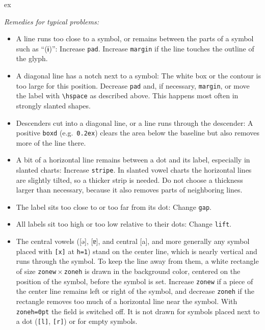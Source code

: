 \documentclass[a4paper,11pt]{article}
\newcommand\cmd[1]{\texttt{\textbackslash #1}}
\newcommand\opt[1]{\texttt{#1}}
\begin{document}
\begin{tcblisting}{ex}
\begin{vowelchart}[slanted] %
\end{vowelchart}
\end{tcblisting}

\noindent\textit{Remedies for typical problems:}
\begin{itemize}
	\item
	A line runs too close to a symbol, or remains between the parts of a symbol such as “(ɨ)”:
	Increase \opt{pad}. Increase \opt{margin} if the line touches the outline of the glyph.
	\item
	A diagonal line has a notch next to a symbol:
	The white box or the contour is too large for this position. Decrease \opt{pad} and, if necessary, \opt{margin}, or move the label with \cmd{hspace} as described above. This happens most often in strongly slanted shapes.
	\item
	Descenders cut into a diagonal line, or a line runs through the descender:
	A positive \opt{boxd} (e.g.\ \texttt{0.2ex}) clears the area below the baseline but also removes more of the line there.
	\item
	A bit of a horizontal line remains between a dot and its label, especially in slanted charts:
	Increase \opt{stripe}. In slanted vowel charts the horizontal lines are slightly tilted, so a thicker strip is needed. Do not choose a thickness larger than necessary, because it also removes parts of neighboring lines.
	\item
	The label sits too close to or too far from its dot:
	Change \opt{gap}.
	\item
	All labels sit too high or too low relative to their dots:
	Change \opt{lift}.
	\item
	The central vowels ([ə], [ɐ], and central [a], and more generally any symbol placed with \texttt{[x]} at \texttt{h=1}) stand on the center line, which is nearly vertical and runs through the symbol. To keep the line away from them, a white rectangle of size \opt{zonew}\,$\times$\,\opt{zoneh} is drawn in the background color, centered on the position of the symbol, before the symbol is set. Increase \opt{zonew} if a piece of the center line remains left or right of the symbol, and decrease \opt{zoneh} if the rectangle removes too much of a horizontal line near the symbol. With \texttt{zoneh=0pt} the field is switched off. It is not drawn for symbols placed next to a dot (\texttt{[l]}, \texttt{[r]}) or for empty symbols.
\end{itemize}
\end{document}
